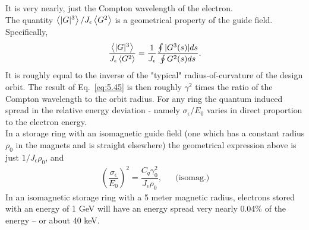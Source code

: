 It is very nearly, just the Compton wavelength of the electron.\\
The quantity $\left< |G|^3 \right>/J_\epsilon \left< G^2 \right>$ is a geometrical property of the guide field. Specifically,
\begin{align}
	\dfrac{\left< |G|^3 \right>}{J_\epsilon \left< G^2 \right>} = \dfrac{1}{J_\epsilon} \dfrac{\oint |G^3(s)|ds}{\oint G^2(s) ds}.
\end{align}
It is roughly equal to the inverse of the "typical" radius-of-curvature of the design orbit. The result of Eq.~\eqref{eq:5.45} is then roughly $\gamma^2$ times the ratio of the Compton wavelength to the orbit radius. For any ring the quantum induced spread in the relative energy deviation - namely $\sigma_\epsilon/E_0$ varies in direct proportion to the electron energy.\\
In a storage ring with an isomagnetic guide field (one which has a constant radius $\rho_0$ in the magnets and is straight elsewhere) the geometrical expression above is just $1/J_\epsilon \rho_0$, and
\begin{align}\label{eq:5.48}
	\left( \dfrac{\sigma_\epsilon}{E_0}\right)^2 = \dfrac{C_q \gamma_0^2}{J_\epsilon \rho_0}, && \text{(isomag.)}
\end{align}
In an isomagnetic storage ring with a 5 meter magnetic radius, electrons stored with an energy of 1 GeV will have an energy spread very nearly 0.04\% of the energy -- or about 40 keV.
